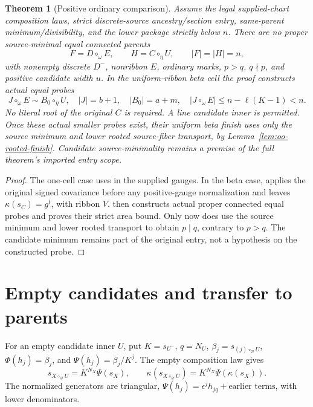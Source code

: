 \documentclass[11pt,a4paper]{amsart}
\numberwithin{equation}{section}
\theoremstyle{plain}
\newtheorem{theorem}{Theorem}[section]
\theoremstyle{definition}
\begin{document}
\begin{theorem}[Positive ordinary comparison]\label{thm:positive-oo}
Assume the legal supplied-chart composition laws, strict discrete-source ancestry/section entry, same-parent minimum/divisibility, and the lower package strictly below \(n\).  There are no proper source-minimal equal connected parents
\[
 F=D\circ_\omega E,\qquad H=C\circ_\eta U,\qquad |F|=|H|=n,
\]
with nonempty discrete \(D^-\), nonribbon \(E\), ordinary marks, \(p>q\), \(q\nmid p\), and positive candidate width \(u\).  In the uniform-ribbon beta cell the proof constructs actual equal probes
\[
 J\circ_\omega E\sim B_0\circ_\eta U,
 \quad |J|=b+1,\quad |B_0|=a+m,
 \quad |J\circ_\omega E|\le n-\ell(K-1)<n.
\]
No literal root of the original \(C\) is required.  A line candidate inner is permitted.  Once these actual smaller probes exist, their uniform beta finish uses only the source minimum and lower rooted source-fiber transport, by Lemma~\ref{lem:oo-rooted-finish}.  Candidate source-minimality remains a premise of the full theorem's imported entry scope.
\end{theorem}
\begin{proof}
The one-cell case uses  in the supplied gauges.  In the beta case,  applies the original signed covariance before any positive-gauge normalization and leaves \(\kappa(s_C)=g^t\), with ribbon \(V\).   then constructs actual proper connected equal probes and proves their strict area bound.  Only now does  use the source minimum and lower rooted transport to obtain \(p\mid q\), contrary to \(p>q\).  The candidate minimum remains part of the original entry, not a hypothesis on the constructed probe.
\end{proof}

\section{Empty candidates and transfer to parents}\label{sec:parent}
For an empty candidate inner \(U\), put \(K=s_{U^-}\), \(q=N_U\), \(\beta_j=s_{(j)\circ_\varnothing U}\),
\(\Phi(h_j)=\beta_j\), and \(\Psi(h_j)=\beta_j/K^j\).  The empty composition law gives
\[
 s_{X\circ_\varnothing U}=K^{N_X}\Psi(s_X),\qquad
 \kappa(s_{X\circ_\varnothing U})=K^{N_X}\Psi(\kappa(s_X)).
\]
The normalized generators are triangular, \(\Psi(h_j)=\epsilon^jh_{jq}+\text{earlier terms}\), with lower denominators.
\end{document}
